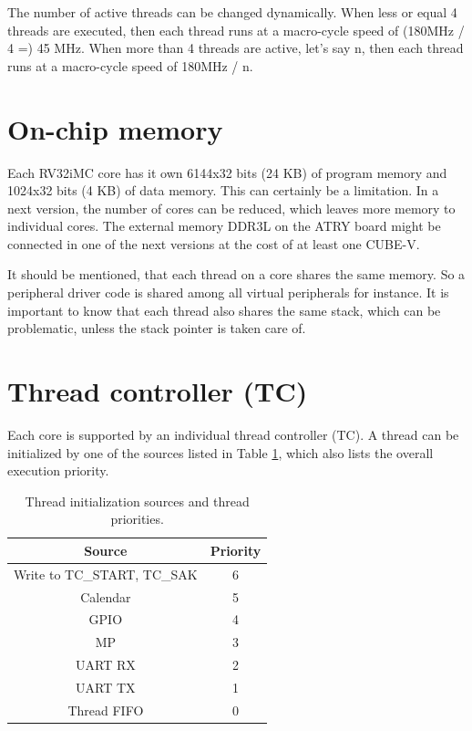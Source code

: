 The number of active threads can be changed dynamically. When less or equal 4 threads are executed, then each thread runs at a macro-cycle speed of (180MHz / 4 =) 45 MHz. When more than 4 threads are active, let's say n, then each thread runs at a macro-cycle speed of 180MHz / n. 



\section{On-chip memory}

Each RV32iMC core has it own 6144x32 bits (24 KB) of program memory and 1024x32 bits (4 KB) of data memory. This can certainly be a limitation. In a next version, the number of cores can be reduced, which leaves more memory to individual cores. The external memory DDR3L on the ATRY board might be connected in one of the next versions at the cost of at least one CUBE-V.

It should be mentioned, that each thread on a core shares the same memory. So a peripheral driver code is shared among all virtual peripherals for instance.  It is important to know that each thread also shares the same stack, which can be problematic, unless the stack pointer is taken care of.


\section{Thread controller (TC)}

Each core is supported by an individual thread controller (TC). A thread can be initialized by one of the sources listed in Table \ref{prio}, which also lists the overall execution priority. 

\begin{table}[h]
	{
		\begin{small}
			\begin{center}
				\begin{tabular}{c c}
					\hline
					\multicolumn{1}{|c|}{Source} &
					\multicolumn{1}{|c|}{Priority} \\
					\hline
					\multicolumn{1}{|c|}{Write to TC\_START, TC\_SAK} &
					\multicolumn{1}{|c|}{6} \\
					\hline
					\multicolumn{1}{|c|}{Calendar} &
					\multicolumn{1}{|c|}{5} \\
					\hline
					\multicolumn{1}{|c|}{GPIO} &
					\multicolumn{1}{|c|}{4} \\
					\hline
					\multicolumn{1}{|c|}{MP} &
					\multicolumn{1}{|c|}{3} \\
					\hline
					\multicolumn{1}{|c|}{UART RX} &
					\multicolumn{1}{|c|}{2} \\
					\hline
					\multicolumn{1}{|c|}{UART TX} &
					\multicolumn{1}{|c|}{1} \\
					\hline
					\multicolumn{1}{|c|}{Thread FIFO} &
					\multicolumn{1}{|c|}{0} \\
					\hline
				\end{tabular}
			\end{center}
		\end{small}
	}
	\caption{Thread initialization sources and thread priorities.}
	\label{prio}
\end{table}

